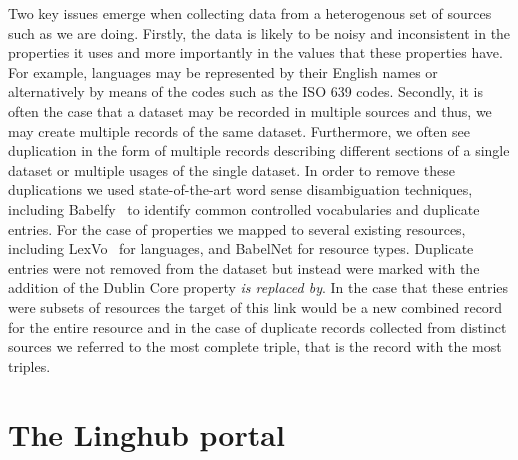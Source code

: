 \documentclass{acm_proc_article-sp}
\begin{document}

Two key issues emerge when collecting data from a heterogenous set of sources 
such as we are doing. Firstly, the data is likely to be noisy and inconsistent 
in the properties it uses and more importantly in the values that these
properties have. For example, languages may be represented by their English 
names or alternatively by means of the codes such as the ISO 639 codes. Secondly,
it is often the case that a dataset may be recorded in multiple sources and thus,
we may create multiple records of the same dataset. Furthermore, we often see
duplication in the form of multiple records describing different sections of a 
single dataset or multiple usages of the single dataset. In order to remove 
these duplications we used state-of-the-art word sense disambiguation techniques, 
including Babelfy~\cite{Moroetal:14tacl} to identify common controlled vocabularies and duplicate
entries. For the case of properties we mapped to several existing resources, 
including LexVo~\cite{de2013lexvo} for languages, and BabelNet for resource types. Duplicate 
entries were not removed from the dataset but instead were marked with the addition
of the Dublin Core property \emph{is replaced by}. In the case that these entries
were subsets of resources the target of this link would be a new combined record
for the entire resource and in the case of duplicate records collected from distinct
sources we referred to the most complete triple, that is the record with the most
triples.

\section{The Linghub portal}
\end{document}
